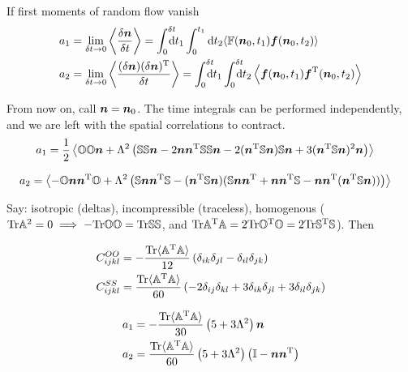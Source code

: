 \documentclass[thesis.tex]{subfiles}
\begin{document}
If first moments of random flow vanish
\begin{align*}
	a_1 &= \lim_{\delta t\to0}\left\langle\frac{\delta \ve n}{\delta t}\right\rangle = \int_0^{\delta t}\!\!\!\!\!\rd t_1\int_0^{t_1}\rd t_2\langle \ma F(\ve n_0,t_1)\ve f(\ve n_0, t_2)\rangle\\
	a_2 &= \lim_{\delta t\to0}\left\langle\frac{(\delta \ve n)(\delta \ve n)\transpose}{\delta t}\right\rangle = \int_0^{\delta t}\!\!\!\!\!\rd t_1 \int_0^{\delta t}\!\!\!\!\!\rd t_2 \left\langle\ve f(\ve n_0,t_1) \ve f\transpose(\ve n_0, t_2)\right\rangle
\end{align*}

From now on, call $\mbox{\boldmath$n$} = \mbox{\boldmath$n$}_0$. The time integrals can be performed independently, and we are left with the spatial correlations to contract. 
\begin{align*}
	a_1 &= \frac{1}{2}\left \langle \mathbb{O} \mathbb{O} \mbox{\boldmath$n$} + \Lambda^2\left(
\mathbb{S} \mathbb{S} \mbox{\boldmath$n$}
-2 \mbox{\boldmath$n$} \mbox{\boldmath$n$}^{\mathrm T} \mathbb{S}\mathbb{S}\mbox{\boldmath$n$}
-2 (\mbox{\boldmath$n$}^{\mathrm T} \mathbb{S}\mbox{\boldmath$n$})\mathbb{S} \mbox{\boldmath$n$} 
+3 (\mbox{\boldmath$n$}^{\mathrm T} \mathbb{S}\mbox{\boldmath$n$})^2 \mbox{\boldmath$n$}
\right) \right\rangle
\end{align*}

\begin{align*}
	a_2  &= \left\langle -\mathbb{O} \mbox{\boldmath$n$} \mbox{\boldmath$n$}^{\mathrm T} \mathbb{O} + \Lambda^2\left( \mathbb{S} \mbox{\boldmath$n$} \mbox{\boldmath$n$}^{\mathrm T}\mathbb{S} -(\mbox{\boldmath$n$}^{\mathrm T} \mathbb{S} \mbox{\boldmath$n$})(\mathbb{S} \mbox{\boldmath$n$} \mbox{\boldmath$n$}^{\mathrm T} + \mbox{\boldmath$n$} \mbox{\boldmath$n$}^{\mathrm T} \mathbb{S} - \mbox{\boldmath$n$} \mbox{\boldmath$n$}^{\mathrm T}(\mbox{\boldmath$n$}^{\mathrm T} \mathbb{S} \mbox{\boldmath$n$}))\right) \right\rangle
\end{align*}

Say: isotropic (deltas), incompressible (traceless), homogenous ($\mbox{Tr} \mathbb{A}^2=0\implies-\mbox{Tr} \mathbb{O}\mathbb{O}=\mbox{Tr}\mathbb{S}\mathbb{S}$, and $\mbox{Tr} \mathbb{A} ^{\mathrm T} \mathbb{A} = 2\mbox{Tr} \mathbb{O}^{\mathrm T} \mathbb{O} = 2\mbox{Tr} \mathbb{S}^{\mathrm T}\mathbb{S}$). Then

\begin{align*}
	C^{OO}_{ijkl} &= -\frac{\mbox{Tr}\langle\mathbb{A}^{\mathrm T}\mathbb{A}\rangle}{12}\left(\delta_{ik}\delta_{jl}-\delta_{il}\delta_{jk}\right)\\
	C^{SS}_{ijkl} &= \frac{\mbox{Tr}\langle\mathbb{A}^{\mathrm T}\mathbb{A}\rangle}{60}\left(-2\delta_{ij}\delta_{kl}+3\delta_{ik}\delta_{jl}+3\delta_{il}\delta_{jk}\right)	
\end{align*}

\begin{align*}
	a_1 &= -\frac{\mbox{Tr}\langle\mathbb{A}^{\mathrm T} \mathbb{A}\rangle}{30} \left(5 + 3\Lambda^2 \right)\mbox{\boldmath$n$}\\
	a_2  &= \frac{\mbox{Tr}\langle\mathbb{A}^{\mathrm T} \mathbb{A}\rangle}{60} \left(5 + 3\Lambda^2 \right)\left(\mathbb{I} - \mbox{\boldmath$n$}\mbox{\boldmath$n$}^{\mathrm T} \right )
\end{align*}
\end{document}
